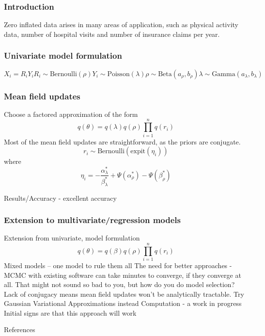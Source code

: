 \documentclass{beamer}
\begin{document}
\begin{frame}
\frametitle{Introduction}
Zero inflated data arises in many areas of application, such as physical activity data,
number of hospital visits and number of insurance claims per year.
\end{frame}

\begin{frame}
\frametitle{Univariate model formulation}
$$
X_i = R_i Y_i
R_i \sim \text{Bernoulli}(\rho)
Y_i \sim \text{Poisson}(\lambda)
\rho \sim \text{Beta}(a_\rho, b_\rho)
\lambda \sim \text{Gamma}(a_\lambda, b_\lambda)
$$
\end{frame}

\begin{frame}
\frametitle{Mean field updates}
Choose a factored approximation of the form
$$
q(\theta) = q(\lambda) q(\rho) \prod_{i=1}^n q(r_i)
$$
Most of the mean field updates are straightforward, as the priors are conjugate.
$$
r_i \sim \text{Bernoulli}(\text{expit}(\eta_i))
$$
where
$$
\eta_i = - \frac{\alpha_\lambda^*}{\beta_\lambda^*} + \Psi(\alpha_\rho^*) - \Psi(\beta_\rho^*)
$$
\end{frame}

\begin{frame}
Results/Accuracy - excellent accuracy
\end{frame}

\begin{frame}
\frametitle{Extension to multivariate/regression models}
Extension from univariate, model formulation
$$
q(\theta) = q(\beta) q(\rho) \prod_{i=1}^n q(r_i)
$$
Mixed models -- one model to rule them all
The need for better approaches - MCMC with existing software can take minutes to
converge, if they converge at all. That might not sound so bad to you, but how do you
do model selection?
Lack of conjugacy means mean field updates won't be analytically tractable. Try
Gaussian Variational Approximations instead
Computation - a work in progress
Initial signs are that this approach will work
\end{frame}

\begin{frame}
References
\end{frame}
\end{document}
